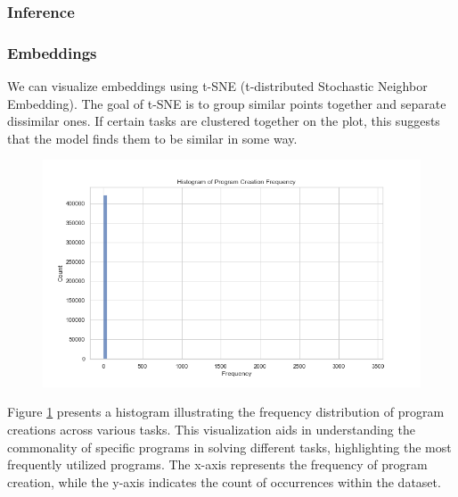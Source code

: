 \subsubsection{Inference}






\subsubsection{Embeddings}
We can visualize embeddings using  t-SNE (t-distributed Stochastic Neighbor Embedding). The goal of t-SNE is to group similar points together and separate dissimilar ones. If certain tasks are clustered together on the plot, this suggests that the model finds them to be similar in some way.






\begin{figure}[H]
    \centering
    \includegraphics[width=\textwidth]{../img/plot_program_creation_frequency.png}
    \caption{}
    \label{fig:program_creation_frequency}
\end{figure}
Figure \ref{fig:program_creation_frequency} presents a histogram illustrating the frequency distribution of program creations across various tasks. This visualization aids in understanding the commonality of specific programs in solving different tasks, highlighting the most frequently utilized programs. The x-axis represents the frequency of program creation, while the y-axis indicates the count of occurrences within the dataset.




